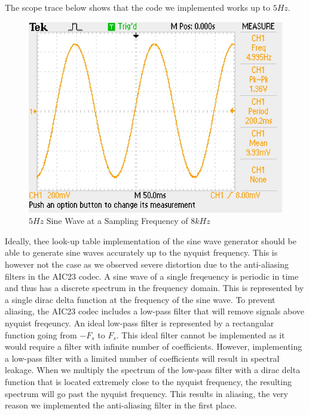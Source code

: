 \documentclass{article}
\begin{document}
The scope trace below shows that the code we implemented works up to $5Hz$.

\begin{figure}[h]
    \centering{}
    \includegraphics[scale=0.7]{8000_5.JPG}
    \caption{$5Hz$ Sine Wave at a Sampling Frequency of $8kHz$}
\end{figure}



Ideally, thee look-up table implementation of the sine wave generator should be able to generate sine waves accurately up to the nyquist frequency. This is however not the case as we observed severe distortion due to the anti-aliasing filters in the AIC23 codec. A sine wave of a single freqeuency is periodic in time and thus has a discrete spectrum in the frequency domain. This is represented by a single dirac delta function at the frequency of the sine wave. To prevent aliasing, the AIC23 codec includes a low-pass filter that will remove signals above nyquist freqeuncy. An ideal low-pass filter is represented by a rectangular function going from $-F_s$ to $F_s$. This ideal filter cannot be implemented as it would require a filter with infinite number of coefficients. However, implementing a low-pass filter with a limited number of coefficients will result in spectral leakage. When we multiply the spectrum of the low-pass filter with a dirac delta function that is located extremely close to the nyquist frequency, the resulting spectrum will go past the nyquist frequency. This results in aliasing, the very reason we implemented the anti-aliasing filter in the first place. 
\end{document}
